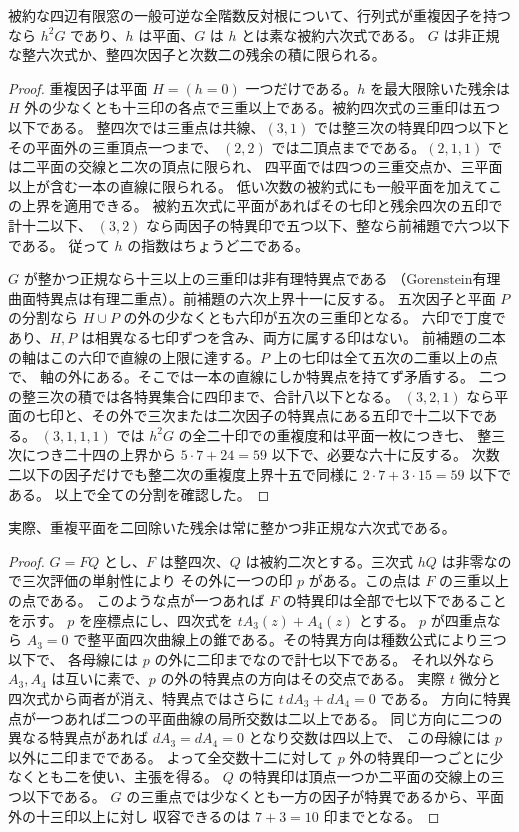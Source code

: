 \begin{theorem}\label{thm:repeated-octic-plane-residual}
被約な四辺有限窓の一般可逆な全階数反対根について、行列式が重複因子を持つなら
$h^2G$ であり、$h$ は平面、$G$ は $h$ とは素な被約六次式である。
$G$ は非正規な整六次式か、整四次因子と次数二の残余の積に限られる。
\end{theorem}
\begin{proof}
重複因子は平面 $H=(h=0)$ 一つだけである。$h$ を最大限除いた残余は
$H$ 外の少なくとも十三印の各点で三重以上である。被約四次式の三重印は五つ以下である。
整四次では三重点は共線、$(3,1)$ では整三次の特異印四つ以下とその平面外の三重頂点一つまで、
$(2,2)$ では二頂点までである。$(2,1,1)$ では二平面の交線と二次の頂点に限られ、
四平面では四つの三重交点か、三平面以上が含む一本の直線に限られる。
低い次数の被約式にも一般平面を加えてこの上界を適用できる。
被約五次式に平面があればその七印と残余四次の五印で計十二以下、
$(3,2)$ なら両因子の特異印で五つ以下、整なら前補題で六つ以下である。
従って $h$ の指数はちょうど二である。

$G$ が整かつ正規なら十三以上の三重印は非有理特異点である
（Gorenstein有理曲面特異点は有理二重点）。前補題の六次上界十一に反する。
五次因子と平面 $P$ の分割なら $H\cup P$ の外の少なくとも六印が五次の三重印となる。
六印で丁度であり、$H,P$ は相異なる七印ずつを含み、両方に属する印はない。
前補題の二本の軸はこの六印で直線の上限に達する。$P$ 上の七印は全て五次の二重以上の点で、
軸の外にある。そこでは一本の直線にしか特異点を持てず矛盾する。
二つの整三次の積では各特異集合に四印まで、合計八以下となる。
$(3,2,1)$ なら平面の七印と、その外で三次または二次因子の特異点にある五印で十二以下である。
$(3,1,1,1)$ では $h^2G$ の全二十印での重複度和は平面一枚につき七、
整三次につき二十四の上界から $5\cdot7+24=59$ 以下で、必要な六十に反する。
次数二以下の因子だけでも整二次の重複度上界十五で同様に $2\cdot7+3\cdot15=59$ 以下である。
以上で全ての分割を確認した。
\end{proof}

\begin{corollary}\label{cor:repeated-octic-plane-integral-sextic}
実際、重複平面を二回除いた残余は常に整かつ非正規な六次式である。
\end{corollary}
\begin{proof}
$G=FQ$ とし、$F$ は整四次、$Q$ は被約二次とする。三次式 $hQ$ は非零なので三次評価の単射性により
その外に一つの印 $p$ がある。この点は $F$ の三重以上の点である。
このような点が一つあれば $F$ の特異印は全部で七以下であることを示す。
$p$ を座標点にし、四次式を $t A_3(z)+A_4(z)$ とする。
$p$ が四重点なら $A_3=0$ で整平面四次曲線上の錐である。その特異方向は種数公式により三つ以下で、
各母線には $p$ の外に二印までなので計七以下である。
それ以外なら $A_3,A_4$ は互いに素で、$p$ の外の特異点の方向はその交点である。
実際 $t$ 微分と四次式から両者が消え、特異点ではさらに $t\,dA_3+dA_4=0$ である。
方向に特異点が一つあれば二つの平面曲線の局所交数は二以上である。
同じ方向に二つの異なる特異点があれば $dA_3=dA_4=0$ となり交数は四以上で、
この母線には $p$ 以外に二印までである。
よって全交数十二に対して $p$ 外の特異印一つごとに少なくとも二を使い、主張を得る。
$Q$ の特異印は頂点一つか二平面の交線上の三つ以下である。
$G$ の三重点では少なくとも一方の因子が特異であるから、平面外の十三印以上に対し
収容できるのは $7+3=10$ 印までとなる。
\end{proof}
